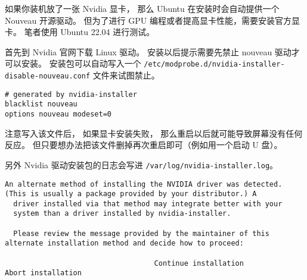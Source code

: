 
如果你装机放了一张 Nvidia 显卡， 那么 Ubuntu 在安装时会自动提供一个 Nouveau 开源驱动。 但为了进行 GPU 编程或者提高显卡性能，需要安装官方显卡。 笔者使用 Ubuntu 22.04 进行测试。

首先到 Nvidia 官网下载 Linux 驱动。 安装以后提示需要先禁止 nouveau 驱动才可以安装。 安装包可以自动写入一个 \verb`/etc/modprobe.d/nvidia-installer-disable-nouveau.conf` 文件来试图禁止。
\begin{lstlisting}[language=none,caption=nvidia-installer-disable-nouveau.conf]
# generated by nvidia-installer
blacklist nouveau
options nouveau modeset=0
\end{lstlisting}

注意写入该文件后， 如果显卡安装失败， 那么重启以后就可能导致屏幕没有任何反应。 但只要想办法把该文件删掉再次重启即可（例如用一个启动 U 盘）。

另外 Nvidia 驱动安装包的日志会写进 \verb`/var/log/nvidia-installer.log`。

\begin{lstlisting}[language=none]
An alternate method of installing the NVIDIA driver was detected.
(This is usually a package provided by your distributor.) A      
  driver installed via that method may integrate better with your
  system than a driver installed by nvidia-installer.

  Please review the message provided by the maintainer of this alternate installation method and decide how to proceed:

                                   Continue installation                        Abort installation 
\end{lstlisting}
